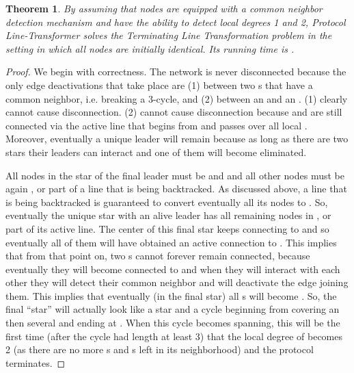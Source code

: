 \documentclass[preprint]{elsarticle}
\newtheorem{theorem}{Theorem}
\begin{document}
\begin{theorem} \label{the:line-transformer}
By assuming that nodes are equipped with a common neighbor detection mechanism and have the ability to detect local degrees 1 and 2, Protocol Line-Transformer solves the Terminating Line Transformation problem in the setting in which all nodes are initially identical. Its running time is .
\end{theorem}
\begin{proof}
We begin with correctness. The network is never disconnected because the only edge deactivations
that take place are (1) between two s that have a common neighbor, i.e.
breaking a 3-cycle, and (2) between an  and an . (1) clearly cannot
cause disconnection. (2) cannot cause disconnection because  and  are
still connected via the active line that begins from  and passes over
all local . Moreover, eventually a unique leader will remain because as long as there are two
stars their leaders can interact and one of them will become eliminated.

All nodes in the star of the final leader must be  and  and all other
nodes must be again ,  or part of a line that is being backtracked. As
discussed above, a line that is being backtracked is guaranteed to convert
eventually all its nodes to . So, eventually the unique star with an
alive leader has all remaining nodes in ,  or part of its active line.
The  center of this final star keeps connecting to  and  so eventually
all of them will have obtained an active connection to . This implies
that from that point on, two s cannot forever remain connected, because
eventually they will become connected to  and when they will interact
with each other they will detect their common neighbor and will deactivate
the edge joining them. This implies that eventually (in the final star)
all s will become . So, the final ``star'' will actually look like a star
and a cycle beginning from  covering an  then several  and ending at
. When this cycle becomes spanning, this will be the first time (after
the cycle had length at least 3) that the local degree of  becomes 2
(as there are no more s and s left in its neighborhood) and the protocol
terminates.


\end{proof}
\end{document}
